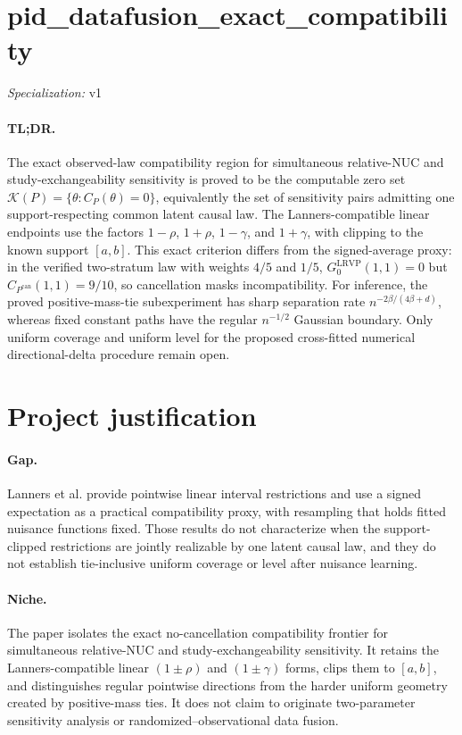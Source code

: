 \documentclass{article}
\begin{document}
\sloppy

\section*{pid\_\allowbreak{}datafusion\_\allowbreak{}exact\_\allowbreak{}compatibility}

\noindent\textit{Specialization:} v1\par

\paragraph{TL;DR.} The exact observed-law compatibility region for simultaneous relative-NUC and study-exchangeability sensitivity is proved to be the computable zero set \(\mathcal K(P)=\{\theta:C_P(\theta)=0\}\), equivalently the set of sensitivity pairs admitting one support-respecting common latent causal law. The Lanners-compatible linear endpoints use the factors \(1-\rho\), \(1+\rho\), \(1-\gamma\), and \(1+\gamma\), with clipping to the known support \([a,b]\). This exact criterion differs from the signed-average proxy: in the verified two-stratum law with weights \(4/5\) and \(1/5\), \(G_0^{\mathrm{LRVP}}(1,1)=0\) but \(C_{P^{\mathrm{can}}}(1,1)=9/10\), so cancellation masks incompatibility. For inference, the proved positive-mass-tie subexperiment has sharp separation rate \(n^{-2\beta/(4\beta+d)}\), whereas fixed constant paths have the regular \(n^{-1/2}\) Gaussian boundary. Only uniform coverage and uniform level for the proposed cross-fitted numerical directional-delta procedure remain open.

\section{Project justification}

\paragraph{Gap.} Lanners et al. provide pointwise linear interval restrictions and use a signed expectation as a practical compatibility proxy, with resampling that holds fitted nuisance functions fixed. Those results do not characterize when the support-clipped restrictions are jointly realizable by one latent causal law, and they do not establish tie-inclusive uniform coverage or level after nuisance learning.

\paragraph{Niche.} The paper isolates the exact no-cancellation compatibility frontier for simultaneous relative-NUC and study-exchangeability sensitivity. It retains the Lanners-compatible linear \((1\pm\rho)\) and \((1\pm\gamma)\) forms, clips them to \([a,b]\), and distinguishes regular pointwise directions from the harder uniform geometry created by positive-mass ties. It does not claim to originate two-parameter sensitivity analysis or randomized--observational data fusion.
\end{document}
